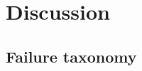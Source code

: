 \providecommand{\nc}[2]{\parbox[t]{#1}{\raggedright #2}}   %
\section{Discussion} \label{sec:discussion}

\subsection{Failure taxonomy} \label{sec:failures}

